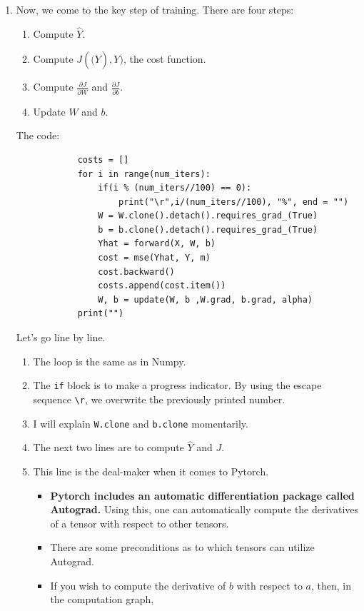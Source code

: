 \documentclass{article}
\begin{document}
\begin{enumerate}
        \item Now, we come to the key step of training. There are four steps:
        \begin{enumerate}
            \item Compute $\hat{Y}$.
            \item Compute $J(\hat(Y), Y)$, the cost function.
            \item Compute $\frac{\partial{J}}{\partial{W}}$ and $\frac{\partial{J}}{\partial{b}}$.
            \item Update $W$ and $b$.
        \end{enumerate}
        The code:
        \begin{verbatim}
            costs = []
            for i in range(num_iters):
                if(i % (num_iters//100) == 0):
                    print("\r",i/(num_iters//100), "%", end = "")
                W = W.clone().detach().requires_grad_(True)
                b = b.clone().detach().requires_grad_(True)
                Yhat = forward(X, W, b)
                cost = mse(Yhat, Y, m)
                cost.backward()
                costs.append(cost.item())
                W, b = update(W, b ,W.grad, b.grad, alpha)
            print("")
        \end{verbatim}
        Let's go line by line.
        \begin{enumerate}
            \item The loop is the same as in Numpy.
            \item The {\tt if} block is to make a progress indicator.
            By using the escape sequence {\tt \textbackslash r}, we overwrite the previously printed number.
            \item I will explain {\tt W.clone} and {\tt b.clone} momentarily.
            \item The next two lines are to compute $\hat{Y}$ and $J$.
            \item This line is the deal-maker when it comes to Pytorch. 
            \begin{itemize}
                \item \textbf{Pytorch includes an automatic differentiation package called Autograd.}
                Using this, one can automatically compute the derivatives of a tensor with respect to other tensors.
                \item There are some preconditions as to which tensors can utilize Autograd.
                \item If you wish to compute the derivative of $b$ with respect to $a$, then, in the computation graph,

\end{itemize}
\end{enumerate}
\end{enumerate}
\end{document}
